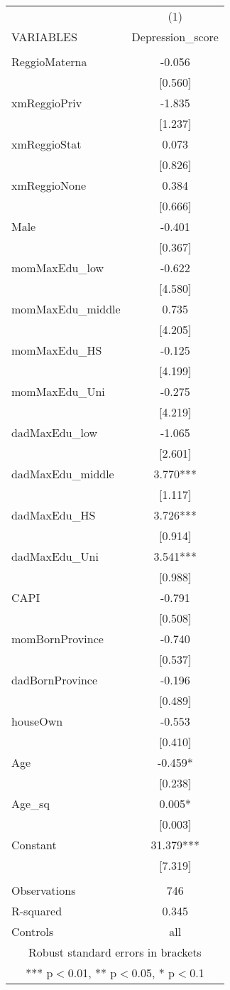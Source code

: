 \documentclass[]{article}
\begin{document}
\begin{tabular}{lc} \hline
 & (1) \\
VARIABLES & Depression\_score \\ \hline
 &  \\
ReggioMaterna & -0.056 \\
 & [0.560] \\
xmReggioPriv & -1.835 \\
 & [1.237] \\
xmReggioStat & 0.073 \\
 & [0.826] \\
xmReggioNone & 0.384 \\
 & [0.666] \\
Male & -0.401 \\
 & [0.367] \\
momMaxEdu\_low & -0.622 \\
 & [4.580] \\
momMaxEdu\_middle & 0.735 \\
 & [4.205] \\
momMaxEdu\_HS & -0.125 \\
 & [4.199] \\
momMaxEdu\_Uni & -0.275 \\
 & [4.219] \\
dadMaxEdu\_low & -1.065 \\
 & [2.601] \\
dadMaxEdu\_middle & 3.770*** \\
 & [1.117] \\
dadMaxEdu\_HS & 3.726*** \\
 & [0.914] \\
dadMaxEdu\_Uni & 3.541*** \\
 & [0.988] \\
CAPI & -0.791 \\
 & [0.508] \\
momBornProvince & -0.740 \\
 & [0.537] \\
dadBornProvince & -0.196 \\
 & [0.489] \\
houseOwn & -0.553 \\
 & [0.410] \\
Age & -0.459* \\
 & [0.238] \\
Age\_sq & 0.005* \\
 & [0.003] \\
Constant & 31.379*** \\
 & [7.319] \\
 &  \\
Observations & 746 \\
R-squared & 0.345 \\
 Controls & all \\ \hline
\multicolumn{2}{c}{ Robust standard errors in brackets} \\
\multicolumn{2}{c}{ *** p$<$0.01, ** p$<$0.05, * p$<$0.1} \\
\end{tabular}
\end{document}
